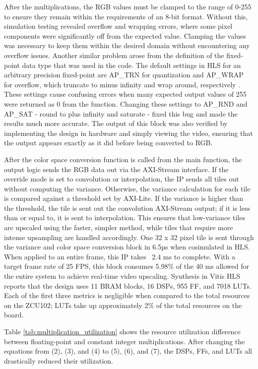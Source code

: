 \documentclass{article}
\newcounter{subsubsubsection}[subsubsection]
\begin{document}
                    \par After the multiplications, the RGB values must be clamped to the range of 0-255 to ensure they remain within the requirements of an 8-bit format. Without this, simulation testing revealed overflow and wrapping errors, where some pixel components were significantly off from the expected value. Clamping the values was necessary to keep them within the desired domain without encountering any overflow issues. Another similar problem arose from the definition of the fixed-point data type that was used in the code. The default settings in HLS for an arbitrary precision fixed-point are AP\_TRN for quantization and AP\_WRAP for overflow, which truncate to minus infinity and wrap around, respectively \cite{amd_vitis_nodate}. These settings cause confusing errors when many expected output values of 255 were returned as 0 from the function. Changing these settings to AP\_RND and AP\_SAT - round to plus infinity and saturate - fixed this bug and made the results much more accurate. The output of this block was also verified by implementing the design in hardware and simply viewing the video, ensuring that the output appears exactly as it did before being converted to RGB.
                    \par After the color space conversion function is called from the main function, the output logic sends the RGB data out via the AXI-Stream interface. If the override mode is set to convolution or interpolation, the IP sends all tiles out without computing the variance. Otherwise, the variance calculation for each tile is compared against a threshold set by AXI-Lite. If the variance is higher than the threshold, the tile is sent out the convolution AXI-Stream output; if it is less than or equal to, it is sent to interpolation. This ensures that low-variance tiles are upscaled using the faster, simpler method, while tiles that require more intense upsampling are handled accordingly. 
                    \noindent One 32 x 32 pixel tile is sent through the variance and color space conversion block in 6.5µs when cosimulated in HLS. When applied to an entire frame, this IP takes ~2.4 ms to complete. With a target frame rate of 25 FPS, this block consumes 5.98\% of the 40 ms allowed for the entire system to achieve real-time video upscaling. Synthesis in Vitis HLS reports that the design uses 11 BRAM blocks, 16 DSPs, 955 FF, and 7018 LUTs. Each of the first three metrics is negligible when compared to the total resources on the ZCU102; LUTs take up approximately 2\% of the total resources on the board. 
                    \par Table \ref{tab:multiplication_utilization} shows the resource utilization difference between floating-point and constant integer multiplications. After changing the equations from (2), (3), and (4) to (5), (6), and (7), the DSPs, FFs, and LUTs all drastically reduced their utilization. 
\end{document}
